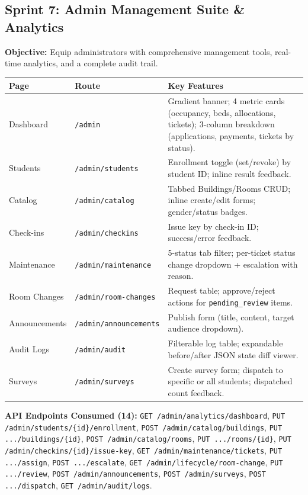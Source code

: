 \documentclass[12pt,a4paper]{article}
\begin{document}
\subsection{Sprint 7: Admin Management Suite \& Analytics}

\textbf{Objective:} Equip administrators with comprehensive management tools, real-time analytics, and a complete audit trail.

\begin{longtable}{p{3.5cm}p{3.5cm}p{6cm}}
\toprule
\textbf{Page} & \textbf{Route} & \textbf{Key Features} \\
\midrule
Dashboard & \texttt{/admin} & Gradient banner; 4 metric cards (occupancy, beds, allocations, tickets); 3-column breakdown (applications, payments, tickets by status). \\
Students & \texttt{/admin/students} & Enrollment toggle (set/revoke) by student ID; inline result feedback. \\
Catalog & \texttt{/admin/catalog} & Tabbed Buildings/Rooms CRUD; inline create/edit forms; gender/status badges. \\
Check-ins & \texttt{/admin/checkins} & Issue key by check-in ID; success/error feedback. \\
Maintenance & \texttt{/admin/maintenance} & 5-status tab filter; per-ticket status change dropdown + escalation with reason. \\
Room Changes & \texttt{/admin/room-changes} & Request table; approve/reject actions for \texttt{pending\_review} items. \\
Announcements & \texttt{/admin/announcements} & Publish form (title, content, target audience dropdown). \\
Audit Logs & \texttt{/admin/audit} & Filterable log table; expandable before/after JSON state diff viewer. \\
Surveys & \texttt{/admin/surveys} & Create survey form; dispatch to specific or all students; dispatched count feedback. \\
\bottomrule
\end{longtable}

\textbf{API Endpoints Consumed (14):} \texttt{GET /admin/analytics/dashboard}, \texttt{PUT /admin/students/\{id\}/enrollment}, \texttt{POST /admin/catalog/buildings}, \texttt{PUT .../buildings/\{id\}}, \texttt{POST /admin/catalog/rooms}, \texttt{PUT .../rooms/\{id\}}, \texttt{PUT /admin/checkins/\{id\}/issue-key}, \texttt{GET /admin/maintenance/tickets}, \texttt{PUT .../assign}, \texttt{POST .../escalate}, \texttt{GET /admin/lifecycle/room-change}, \texttt{PUT .../review}, \texttt{POST /admin/announcements}, \texttt{POST /admin/surveys}, \texttt{POST .../dispatch}, \texttt{GET /admin/audit/logs}.
\end{document}
